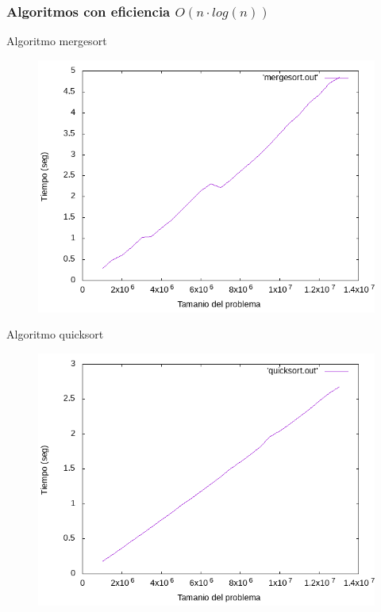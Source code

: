 \documentclass{beamer}
\begin{document}
\subsubsection{Algoritmos con eficiencia $O(n \cdot log(n))$}

\begin{frame}[fragile]{Algoritmo mergesort}
\begin{figure}[H]
\centering
\includegraphics[scale=0.5]{empirica_mergesort.png}
\end{figure}
\end{frame}

\begin{frame}[fragile]{Algoritmo quicksort}
\begin{figure}[H]
\centering
\includegraphics[scale=0.5]{empirica_quicksort.png}
\end{figure}
\end{frame}
\end{document}
